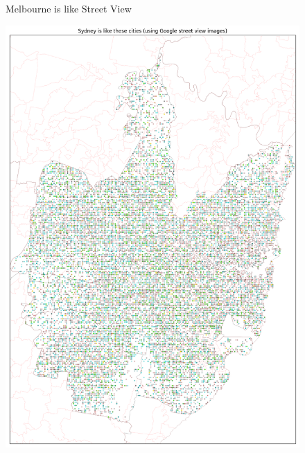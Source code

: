 \documentclass[final,3p,times,authoryear]{elsarticle}
\begin{document}
\begin{figure}[!htbp]
\caption{Melbourne is like Street View}    
 \label{fig:melmaps}  
\end{figure} 


\begin{figure}[!htbp]
\centering    
\includegraphics[scale=0.25]{Images/SydneyOverall_street.png} 

\end{figure}
\end{document}
